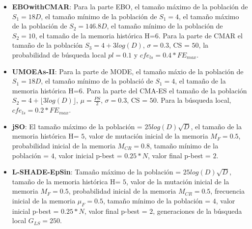 \begin{itemize}
\item \textbf{EBOwithCMAR}: Para la parte EBO, el tamaño máximo de la población de $S_1 = 18D$, el tamaño mínimo de la población de $S_1 = 4$, el tamaño máximo de la población de $S_2 = 146.8D$, el tamaño mínimo de la población de $S_2 = 10$, el tamaño de la memoria histórica H=$6$. Para la parte de CMAR el tamaño de la población $S_3 = 4 + 3log(D)$, $\sigma=0.3$, CS = $50$, la probabilidad de búsqueda local $pl = 0.1$ y $cfe_{ls} = 0.4* FE_{max}$.
\item \textbf{UMOEAs-II}: Para la parte de MODE, el tamaño máxio de la población de $S_1 = 18D$, el tamaño mínimo de la població de $S_1 = 4$, el tamaño de la memoria histórica H=$6$. Para la parte del CMA-ES el tamaño de la población $S_2 = 4 + \lfloor 3log(D) \rfloor$, $\mu=\frac{PS}{2}$, $\sigma=0.3$, CS = $50$. Para la búsqueda local, $cfe_{ls} = 0.2 * FE_{max}$.
\item \textbf{jSO}: El tamaño máximo de la población = $25log(D)\sqrt{D}$, el tamaño de la memoria histórica H= $5$, valor de mutación inicial de la memoria $M_F = 0.5$, probabilidad inicial de la memoria $M_{CR} = 0.8$, tamaño mínimo de la población = $4$, valor inicial p-best = $0.25*N$, valor final p-best = $2$.
\item \textbf{L-SHADE-EpSin}: Tamaño máximo de la población = $25log(D)\sqrt{D}$, tamaño de la memoria histórica H= $5$, valor de la mutación inicial de la memoria $M_F = 0.5$, probabilidad inicial de la memoria $M_{CR} = 0.5$, frecuencia inicial de la memoria $\mu_F = 0.5$, tamaño mínimo de la población = $4$, valor inicial p-best = $0.25*N$, valor final p-best = $2$, generaciones de la búsqueda local $G_{LS}=250$.

\end{itemize}
